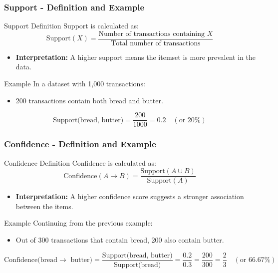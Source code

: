 \documentclass[aspectratio=169]{beamer}
\begin{document}
\begin{frame}[fragile]
    \frametitle{Support - Definition and Example}
    \begin{block}{Support Definition}
        Support is calculated as:
        \begin{equation}
            \text{Support}(X) = \frac{\text{Number of transactions containing } X}{\text{Total number of transactions}}
        \end{equation}
        \begin{itemize}
            \item \textbf{Interpretation:} A higher support means the itemset is more prevalent in the data.
        \end{itemize}
    \end{block}
    
    \begin{block}{Example}
        In a dataset with 1,000 transactions:
        \begin{itemize}
            \item 200 transactions contain both bread and butter.
        \end{itemize}
        \begin{equation}
            \text{Support(bread, butter)} = \frac{200}{1000} = 0.2 \quad (\text{or } 20\%)
        \end{equation}
    \end{block}
\end{frame}

\begin{frame}[fragile]
    \frametitle{Confidence - Definition and Example}
    \begin{block}{Confidence Definition}
        Confidence is calculated as:
        \begin{equation}
            \text{Confidence}(A \rightarrow B) = \frac{\text{Support}(A \cup B)}{\text{Support}(A)}
        \end{equation}
        \begin{itemize}
            \item \textbf{Interpretation:} A higher confidence score suggests a stronger association between the items.
        \end{itemize}
    \end{block}
    
    \begin{block}{Example}
        Continuing from the previous example:
        \begin{itemize}
            \item Out of 300 transactions that contain bread, 200 also contain butter.
        \end{itemize}
        \begin{equation}
            \text{Confidence(bread} \rightarrow \text{ butter)} = \frac{\text{Support(bread, butter)}}{\text{Support(bread)}} = \frac{0.2}{0.3} = \frac{200}{300} = \frac{2}{3} \quad (\text{or } 66.67\%)
        \end{equation}
    \end{block}
\end{frame}
\end{document}
